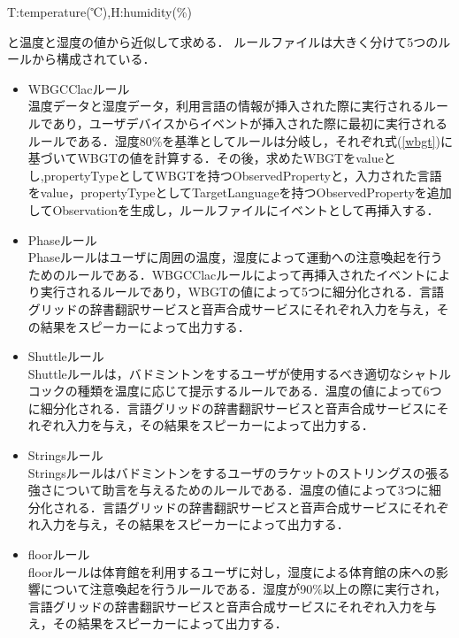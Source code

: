 \documentclass{kuisthesis}			%
\begin{document}
\begin{itemize}
\begin{flushright}
T:temperature(℃),H:humidity(\%)
\end{flushright}
と温度と湿度の値から近似して求める．
ルールファイルは大きく分けて5つのルールから構成されている．
\begin{itemize}
\item WBGCClacルール\\
温度データと湿度データ，利用言語の情報が挿入された際に実行されるルールであり，ユーザデバイスからイベントが挿入された際に最初に実行されるルールである．湿度80\%を基準としてルールは分岐し，それぞれ式(\ref{wbgt})に基づいてWBGTの値を計算する．その後，求めたWBGTをvalueとし,propertyTypeとしてWBGTを持つObservedPropertyと，入力された言語をvalue，propertyTypeとしてTargetLanguageを持つObservedPropertyを追加してObservationを生成し，ルールファイルにイベントとして再挿入する．
\item Phaseルール\\
Phaseルールはユーザに周囲の温度，湿度によって運動への注意喚起を行うためのルールである．WBGCClacルールによって再挿入されたイベントにより実行されるルールであり，WBGTの値によって5つに細分化される．言語グリッドの辞書翻訳サービスと音声合成サービスにそれぞれ入力を与え，その結果をスピーカーによって出力する．
\item Shuttleルール\\
Shuttleルールは，バドミントンをするユーザが使用するべき適切なシャトルコックの種類を温度に応じて提示するルールである．温度の値によって6つに細分化される．言語グリッドの辞書翻訳サービスと音声合成サービスにそれぞれ入力を与え，その結果をスピーカーによって出力する．
\item Stringsルール\\
Stringsルールはバドミントンをするユーザのラケットのストリングスの張る強さについて助言を与えるためのルールである．温度の値によって3つに細分化される．言語グリッドの辞書翻訳サービスと音声合成サービスにそれぞれ入力を与え，その結果をスピーカーによって出力する．
\item floorルール\\
floorルールは体育館を利用するユーザに対し，湿度による体育館の床への影響について注意喚起を行うルールである．湿度が90\%以上の際に実行され，言語グリッドの辞書翻訳サービスと音声合成サービスにそれぞれ入力を与え，その結果をスピーカーによって出力する．
\end{itemize}


\end{itemize}
\end{document}
